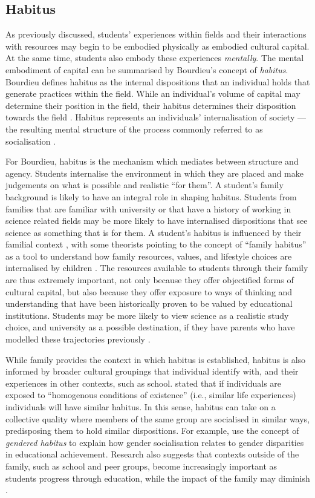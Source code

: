 \subsection*{Habitus}
As previously discussed, students' experiences within fields and their interactions with resources may begin to be embodied physically as embodied cultural capital. At the same time, students also embody these experiences \textit{mentally}. The mental embodiment of capital can be summarised by Bourdieu's concept  of \textit{habitus}. Bourdieu defines habitus as the internal dispositions that an individual holds that generate practices within the field. While an individual's volume of capital may determine their position in the field, their habitus determines their disposition towards the field \citep{bourdieu1992invitation}. Habitus represents an individuals' internalisation of society --- the resulting mental structure of the process commonly referred to as socialisation \citep{Nash1999}.

For Bourdieu, habitus is the mechanism which mediates between structure and agency. Students internalise the environment in which they are placed and make judgements on what is possible and realistic ``for them''. A student's family background is likely to have an integral role in shaping habitus. Students from families that are familiar with university or that have a history of working in science related fields may be more likely to have internalised dispositions that see science as something that is for them. A student's habitus is influenced by their familial context \citep{Dimaggio1982}, with some theorists pointing to the concept of ``family habitus'' as a tool to understand how family resources, values, and lifestyle choices are internalised by children \citep{Archer2012,tomanovic2004family}. The resources available to students through their family are thus extremely important, not only because they offer objectified forms of cultural capital, but also because they offer exposure to ways of thinking and understanding that have been historically proven to be valued by educational institutions. Students may be more likely to view science as a realistic study choice, and university as a possible destination, if they have parents who have modelled these trajectories previously \citep{Lyons_2006}. 

While family provides the context in which habitus is established, habitus is also informed by broader cultural groupings that individual identify with, and their experiences in other contexts, such as school. \citet[p.101]{Bourdieu1984} stated that if individuals are exposed to ``homogenous conditions of existence'' (i.e., similar life experiences) individuals will have similar habitus. In this sense, habitus can take on a collective quality where members of the same group are socialised in similar ways, predisposing them to hold similar dispositions. For example, \citet{Edgerton2014} use the concept of \textit{gendered habitus} to explain how gender socialisation relates to gender disparities in educational achievement. Research also suggests that  contexts outside of the family, such as school and peer groups, become increasingly important as students progress through education, while the impact of the family may diminish \citep{holm2011dealing}.   

